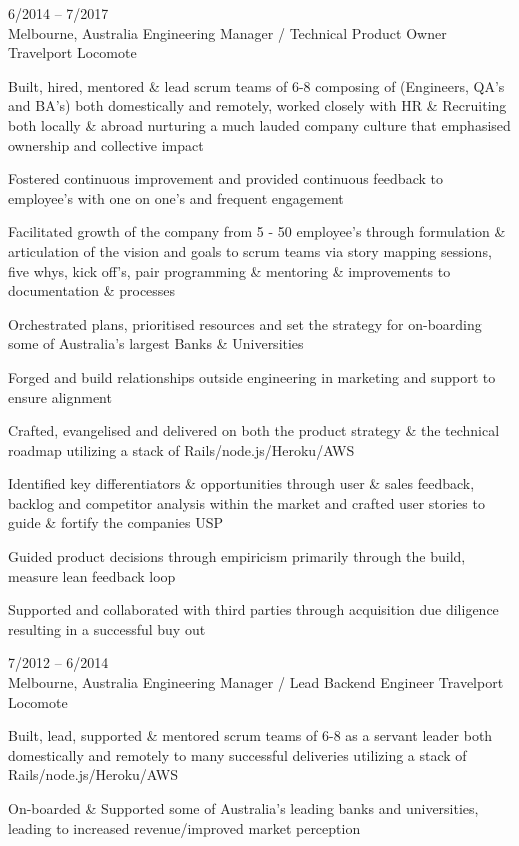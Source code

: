 \documentclass[9pt]{developercv} %
\begin{document}
\begin{entrylist}
{    }
	\entry
		{6/2014 -- 7/2017\\\footnotesize{Melbourne, Australia}}
		{Engineering Manager / Technical Product Owner}
		{Travelport Locomote}
    {Built, hired, mentored \& lead scrum teams of 6-8  composing of (Engineers, QA’s and BA’s) both domestically and remotely, worked closely with HR \& Recruiting both locally \& abroad nurturing a much lauded company culture that emphasised ownership and collective impact
    \par\medskip Fostered continuous improvement and provided continuous feedback to employee’s with one on one’s and frequent engagement
    \par\medskip Facilitated growth of the company from 5 - 50 employee’s through formulation \& articulation of the vision and goals to scrum teams via story mapping sessions, five whys, kick off's, pair programming \& mentoring \& improvements to documentation \& processes
    \par\medskip Orchestrated plans, prioritised resources and set the strategy for on-boarding some of Australia’s largest Banks \& Universities
    \par\medskip Forged and build relationships outside engineering in marketing and support to ensure alignment
    \par\medskip Crafted, evangelised and delivered on both the product strategy \& the technical roadmap  utilizing a stack of  Rails/node.js/Heroku/AWS
    \par\medskip Identified key differentiators \& opportunities through user \& sales feedback, backlog and competitor analysis within the market and crafted user stories to guide \& fortify the companies USP
    \par\medskip Guided product decisions through empiricism primarily through the build, measure lean feedback loop
    \par\medskip Supported and collaborated with third parties through acquisition due diligence resulting in a successful buy out}
	\entry
		{7/2012 -- 6/2014\\\footnotesize{Melbourne, Australia}}
		{Engineering Manager / Lead Backend Engineer}
		{Travelport Locomote}
    {Built, lead, supported \& mentored scrum teams of 6-8 as a servant leader both domestically and remotely to many successful deliveries utilizing a stack of  Rails/node.js/Heroku/AWS
    \par\medskip On-boarded \& Supported some of Australia's leading banks and universities, leading to increased revenue/improved market perception
}
\end{entrylist}
\end{document}
